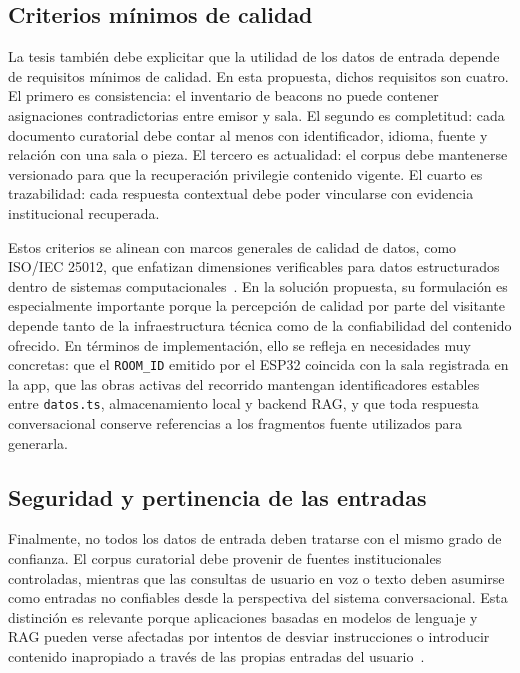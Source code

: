\subsection{Criterios mínimos de calidad}

La tesis también debe explicitar que la utilidad de los datos de entrada depende de requisitos mínimos de calidad. En esta propuesta, dichos requisitos son cuatro. El primero es consistencia: el inventario de beacons no puede contener asignaciones contradictorias entre emisor y sala. El segundo es completitud: cada documento curatorial debe contar al menos con identificador, idioma, fuente y relación con una sala o pieza. El tercero es actualidad: el corpus debe mantenerse versionado para que la recuperación privilegie contenido vigente. El cuarto es trazabilidad: cada respuesta contextual debe poder vincularse con evidencia institucional recuperada.

Estos criterios se alinean con marcos generales de calidad de datos, como ISO/IEC 25012, que enfatizan dimensiones verificables para datos estructurados dentro de sistemas computacionales~\cite{iso25012}. En la solución propuesta, su formulación es especialmente importante porque la percepción de calidad por parte del visitante depende tanto de la infraestructura técnica como de la confiabilidad del contenido ofrecido. En términos de implementación, ello se refleja en necesidades muy concretas: que el \texttt{ROOM\_ID} emitido por el ESP32 coincida con la sala registrada en la app, que las obras activas del recorrido mantengan identificadores estables entre \texttt{datos.ts}, almacenamiento local y backend RAG, y que toda respuesta conversacional conserve referencias a los fragmentos fuente utilizados para generarla.

\subsection{Seguridad y pertinencia de las entradas}

Finalmente, no todos los datos de entrada deben tratarse con el mismo grado de confianza. El corpus curatorial debe provenir de fuentes institucionales controladas, mientras que las consultas de usuario en voz o texto deben asumirse como entradas no confiables desde la perspectiva del sistema conversacional. Esta distinción es relevante porque aplicaciones basadas en modelos de lenguaje y RAG pueden verse afectadas por intentos de desviar instrucciones o introducir contenido inapropiado a través de las propias entradas del usuario~\cite{owaspllm}.

